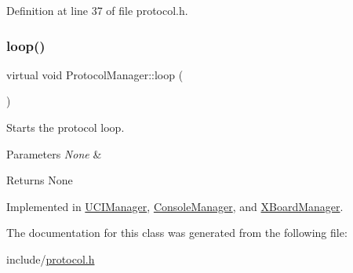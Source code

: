 Definition at line 37 of file protocol.\+h.

\mbox{\label{classProtocolManager_aa3ae25a03e2f070ea486fd9319715a6a}} 
\subsubsection{\texorpdfstring{loop()}{loop()}}
{\footnotesize\ttfamily virtual void Protocol\+Manager\+::loop (\begin{DoxyParamCaption}{ }\end{DoxyParamCaption})\hspace{0.3cm}{\ttfamily [pure virtual]}}



Starts the protocol loop. 


\begin{DoxyParams}{Parameters}
{\em None} & \\
\hline
\end{DoxyParams}
\begin{DoxyReturn}{Returns}
None 
\end{DoxyReturn}


Implemented in \mbox{\hyperlink{classUCIManager_aa2fa2a352e6d58f00c8388da0d8541e1}{U\+C\+I\+Manager}}, \mbox{\hyperlink{classConsoleManager_a69261543a87cf7d3c7ec004c566145fd}{Console\+Manager}}, and \mbox{\hyperlink{classXBoardManager_a7d59ec1b3eaf1d140ad8f7cacd2ae956}{X\+Board\+Manager}}.



The documentation for this class was generated from the following file\+:\begin{DoxyCompactItemize}
\item 
include/\mbox{\hyperlink{protocol_8h}{protocol.\+h}}\end{DoxyCompactItemize}
